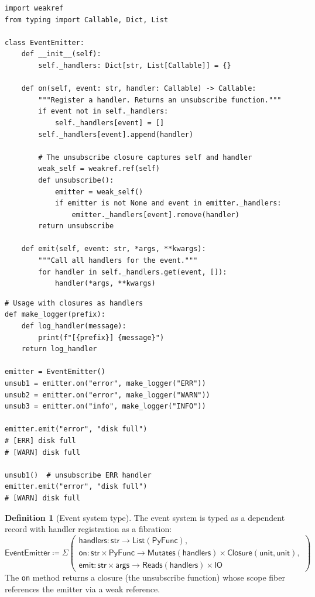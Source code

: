 \documentclass[11pt,a4paper]{report}
\theoremstyle{definition}
\newtheorem{definition}{Definition}[chapter]
\theoremstyle{plain}
\newcommand{\PyFunc}{\mathsf{PyFunc}}
\newcommand{\defeq}{\coloneqq}
\newcommand{\Reads}{\mathsf{Reads}}
\newcommand{\Mutates}{\mathsf{Mutates}}
\newcommand{\IO}{\mathsf{IO}}
\begin{document}
\begin{lstlisting}[style=python]
import weakref
from typing import Callable, Dict, List

class EventEmitter:
    def __init__(self):
        self._handlers: Dict[str, List[Callable]] = {}

    def on(self, event: str, handler: Callable) -> Callable:
        """Register a handler. Returns an unsubscribe function."""
        if event not in self._handlers:
            self._handlers[event] = []
        self._handlers[event].append(handler)

        # The unsubscribe closure captures self and handler
        weak_self = weakref.ref(self)
        def unsubscribe():
            emitter = weak_self()
            if emitter is not None and event in emitter._handlers:
                emitter._handlers[event].remove(handler)
        return unsubscribe

    def emit(self, event: str, *args, **kwargs):
        """Call all handlers for the event."""
        for handler in self._handlers.get(event, []):
            handler(*args, **kwargs)
\end{lstlisting}

\begin{lstlisting}[style=python]
# Usage with closures as handlers
def make_logger(prefix):
    def log_handler(message):
        print(f"[{prefix}] {message}")
    return log_handler

emitter = EventEmitter()
unsub1 = emitter.on("error", make_logger("ERR"))
unsub2 = emitter.on("error", make_logger("WARN"))
unsub3 = emitter.on("info", make_logger("INFO"))

emitter.emit("error", "disk full")
# [ERR] disk full
# [WARN] disk full

unsub1()  # unsubscribe ERR handler
emitter.emit("error", "disk full")
# [WARN] disk full
\end{lstlisting}

\begin{definition}[Event system type]
The event system is typed as a dependent record with handler registration
as a fibration:
\[
  \mathsf{EventEmitter} \defeq \Sigma\!\left(
    \begin{array}{l}
      \mathsf{handlers} : \mathsf{str} \to \mathsf{List}(\PyFunc), \\
      \mathsf{on} : \mathsf{str} \times \PyFunc
        \to \Mutates(\mathsf{handlers}) \times \mathsf{Closure}(\mathsf{unit}, \mathsf{unit}), \\
      \mathsf{emit} : \mathsf{str} \times \mathsf{args}
        \to \Reads(\mathsf{handlers}) \times \IO
    \end{array}
  \right)
\]
The \texttt{on} method returns a closure (the unsubscribe function)
whose scope fiber references the emitter via a weak reference.
\end{definition}
\end{document}
